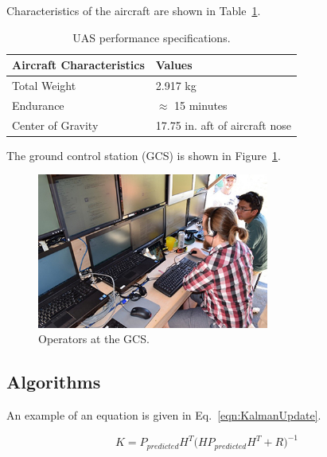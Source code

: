 \documentclass{article}
\begin{document}
Characteristics of the aircraft are shown in Table~\ref{table:UASPerformance}.

\begin{table}
	\begin{center}
	\begin{tabular}{|p{6cm}|p{6cm}|}
	\hline
	\textbf{Aircraft Characteristics} & \textbf{Values} \\
	\hline
	Total Weight & 2.917 kg \\
	\hline
	Endurance & $\approx$ 15 minutes \\
	\hline
	Center of Gravity & 17.75 in. aft of aircraft nose\\
	\hline
	\end{tabular}
	\caption{UAS performance specifications.}
	\label{table:UASPerformance}
	\end{center}
\end{table}

The ground control station (GCS) is shown in Figure~\ref{fig:GroundControlStation}.  

\begin{figure}[ht]
	\centering
    \includegraphics[width=3in]{GroundControlStation}
    \caption{Operators at the GCS.}
    \label{fig:GroundControlStation}
\end{figure}

\subsection{Algorithms}

An example of an equation is given in Eq.~\ref{eqn:KalmanUpdate}.

\begin{equation}
	K = P_{predicted} H^{T} \Big( H P_{predicted} H^{T}+R\Big) ^{-1}
	\label{eqn:KalmanUpdate}
\end{equation}





\end{document}
